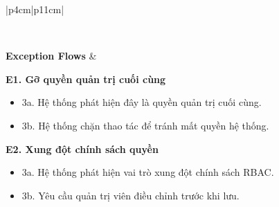 \begin{longtable}{|p{4cm}|p{11cm}|}
\begin{minipage}[t]{\linewidth}
\end{minipage}
\\ \hline

\textbf{Exception Flows} &
\begin{minipage}[t]{\linewidth}
\vspace{0.3mm}

\textbf{E1. Gỡ quyền quản trị cuối cùng}
\begin{itemize}
\item 3a. Hệ thống phát hiện đây là quyền quản trị cuối cùng.
\item 3b. Hệ thống chặn thao tác để tránh mất quyền hệ thống.
\end{itemize}

\textbf{E2. Xung đột chính sách quyền}
\begin{itemize}
\item 3a. Hệ thống phát hiện vai trò xung đột chính sách RBAC.
\item 3b. Yêu cầu quản trị viên điều chỉnh trước khi lưu.
\end{itemize}

\end{minipage}
\\ \hline

\end{longtable}

